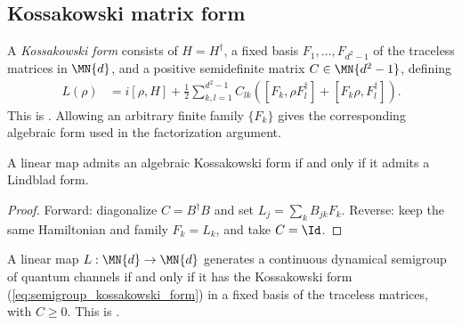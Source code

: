 \subsection{Kossakowski matrix form}

\begin{definition}\label{def:kossakowski_form}
    \leanok
    A \emph{Kossakowski form} consists of $H=H^\dagger$, a fixed basis
    $F_1,\ldots,F_{d^2-1}$ of the traceless matrices in
    $\MN{d}$, and a positive semidefinite matrix
    $C\in\MN{d^2-1}$, defining
    \begin{align}
        L(\rho)
        &= i[\rho,H]
        + \tfrac{1}{2}\sum_{k,l=1}^{d^2-1}C_{lk}
        ([F_k,\rho F_l^\dagger]+[F_k\rho,F_l^\dagger]).
        \label{eq:semigroup_kossakowski_form}
    \end{align}
    This is \cite[Theorem~7.1, Equation~(7.23)]{Wolf2012Quantum}.
    Allowing an arbitrary finite family $\{F_k\}$ gives the corresponding
    algebraic form used in the factorization argument.
\end{definition}

\begin{theorem}
    \label{thm:kossakowski_iff_lindblad}
    \leanok
    A linear map admits an algebraic Kossakowski form if and only if it admits
    a Lindblad form.
\end{theorem}

\begin{proof}
    \leanok
    Forward: diagonalize $C=B^\dagger B$ and set
    $L_j=\sum_k B_{jk}F_k$.
    Reverse: keep the same Hamiltonian and family $F_k=L_k$, and take
    $C=\Id$.
\end{proof}

\begin{theorem}
    \label{thm:gksl_iff_basis_kossakowski}
    \leanok
    A linear map $L:\MN{d}\to\MN{d}$ generates a continuous dynamical
    semigroup of quantum channels if and only if it has the
    Kossakowski form (\ref{eq:semigroup_kossakowski_form}) in a fixed basis of
    the traceless matrices, with $C\geq 0$.
    This is \cite[Theorem~7.1, Equations~(7.20)--(7.23)]{Wolf2012Quantum}.
\end{theorem}

